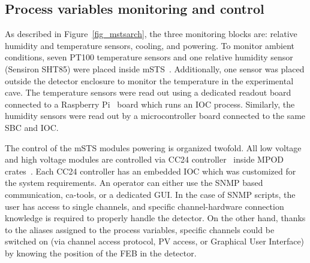 \subsection{Process variables monitoring and control}
As described in Figure~\ref{fig_mstsarch}, the three monitoring blocks are: relative humidity and temperature sensors, cooling, and powering. To monitor ambient conditions, seven PT100 temperature sensors and one relative humidity sensor (Sensiron SHT85) were placed inside \gls{mSTS}~\cite{SHT85}. Additionally, one sensor was placed outside the detector enclosure to monitor the temperature in the experimental cave. The temperature sensors were read out using a dedicated readout board connected to a Raspberry Pi~\cite{raspberry} board which runs an \gls{IOC} process. Similarly, the humidity sensors were read out by a microcontroller board connected to the same \gls{SBC} and \gls{IOC}.

The control of the \gls{mSTS} modules powering is organized twofold. All low voltage and high voltage modules are controlled via CC24 controller~\cite{cc24} inside MPOD crates~\cite{mpod}. Each CC24 controller has an embedded \gls{IOC} which was customized for the system requirements.  An operator can either use the \gls{SNMP} based communication, ca-tools, or a dedicated \gls{GUI}. In the case of SNMP scripts, the user has access to single channels, and specific channel-hardware connection knowledge is required to properly handle the detector. On the other hand, thanks to the aliases assigned to the process variables, specific channels could be switched on (via channel access protocol, PV access, or Graphical User Interface) by knowing the position of the \gls{FEB} in the detector.

